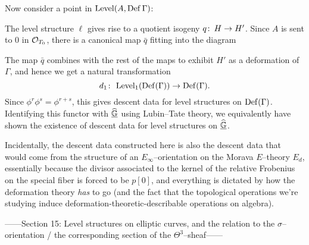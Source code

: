 Now consider a point in $\operatorname{Level}(A, \operatorname{Def} \Gamma)$:
\begin{center}
\end{center}
The level structure $\ell$ gives rise to a quotient isogeny $q\colon\thinspace H \to H'$.  Since $A$ is sent to $0$ in $\mathcal{O}_{T_0}$, there is a canonical map $\bar q$ fitting into the diagram
\begin{center}
\end{center}
The map $\bar q$ combines with the rest of the maps to exhibit $H'$ as a deformation of $\Gamma$, and hence we get a natural transformation \[d_1\colon\thinspace \operatorname{Level}_1(\operatorname{Def}(\Gamma)) \to \operatorname{Def}(\Gamma).\]  Since $\phi^r \phi^s = \phi^{r+s}$, this gives descent data for level structures on $\operatorname{Def}(\Gamma)$.  Identifying this functor with $\underline{\widehat{\mathbb G}}$ using Lubin--Tate theory, we equivalently have shown the existence of descent data for level structures on $\underline{\widehat{\mathbb G}}$.

Incidentally, the descent data constructed here is also the descent data that would come from the structure of an $E_\infty$--orientation on the Morava $E$--theory $E_d$, essentially because the divisor associated to the kernel of the relative Frobenius on the special fiber is forced to be $p[0]$, and everything is dictated by how the deformation theory \emph{has} to go (and the fact that the topological operations we're studying induce deformation-theoretic-describable operations on algebra).

------Section 15: Level structures on elliptic curves, and the relation to the $\sigma$--orientation / the corresponding section of the $\Theta^3$--sheaf------








